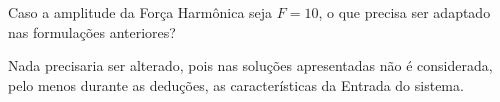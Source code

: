 \documentclass{article}
\begin{document}
\newpage
\begin{exercise}\label{ex17}
    Caso a amplitude da Força Harmônica seja $F = 10$, o que precisa ser adaptado nas formulações anteriores?
\end{exercise}
\begin{resolution}
    Nada precisaria ser alterado, pois nas soluções apresentadas não é considerada, pelo menos durante as deduções, as características da Entrada do sistema.
\end{resolution}
\end{document}
